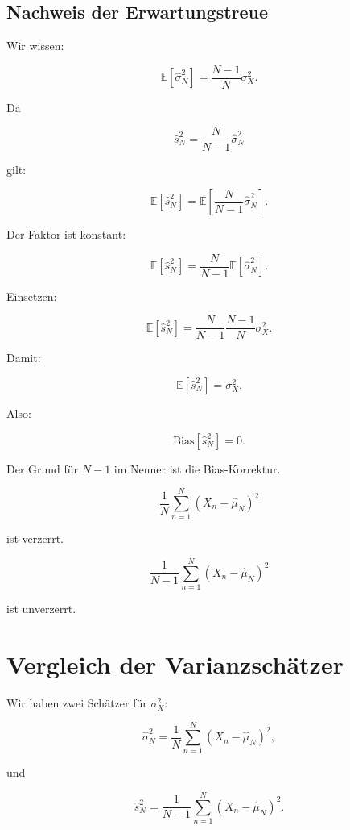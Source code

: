 \subsection{Nachweis der Erwartungstreue}

Wir wissen:

\[
    \mathbb{E}[\hat{\sigma}^2_N]
    =
    \frac{N-1}{N}
    \sigma_X^2.
\]

Da

\[
    \hat{s}^2_N
    =
    \frac{N}{N-1}
    \hat{\sigma}^2_N
\]

gilt:

\[
    \mathbb{E}[\hat{s}^2_N]
    =
    \mathbb{E}\left[
        \frac{N}{N-1}
        \hat{\sigma}^2_N
    \right].
\]

Der Faktor ist konstant:

\[
    \mathbb{E}[\hat{s}^2_N]
    =
    \frac{N}{N-1}
    \mathbb{E}[\hat{\sigma}^2_N].
\]

Einsetzen:

\[
    \mathbb{E}[\hat{s}^2_N]
    =
    \frac{N}{N-1}
    \frac{N-1}{N}
    \sigma_X^2.
\]

Damit:

\[
    \mathbb{E}[\hat{s}^2_N]
    =
    \sigma_X^2.
\]

Also:

\[
    \mathrm{Bias}[\hat{s}^2_N] = 0.
\]

\begin{examtipbox}
Der Grund für \(N-1\) im Nenner ist die Bias-Korrektur.

\[
    \frac{1}{N}
    \sum_{n=1}^{N}
    (X_n-\hat{\mu}_N)^2
\]

ist verzerrt.

\[
    \frac{1}{N-1}
    \sum_{n=1}^{N}
    (X_n-\hat{\mu}_N)^2
\]

ist unverzerrt.
\end{examtipbox}

\section{Vergleich der Varianzschätzer}

Wir haben zwei Schätzer für \(\sigma_X^2\):

\[
    \hat{\sigma}^2_N
    =
    \frac{1}{N}
    \sum_{n=1}^{N}
    (X_n-\hat{\mu}_N)^2,
\]

und

\[
    \hat{s}^2_N
    =
    \frac{1}{N-1}
    \sum_{n=1}^{N}
    (X_n-\hat{\mu}_N)^2.
\]

